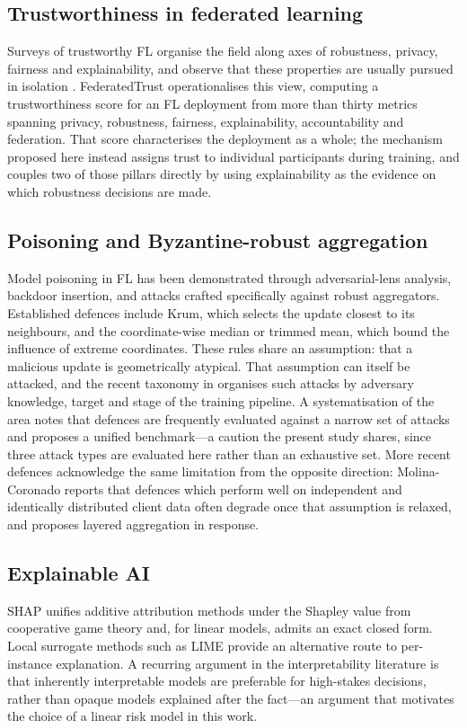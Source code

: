 \documentclass[conference]{IEEEtran}
\begin{document}
\subsection{Trustworthiness in federated learning}
Surveys of trustworthy FL organise the field along axes of robustness,
privacy, fairness and explainability, and observe that these properties are
usually pursued in isolation \cite{tariq2023trustworthy}. FederatedTrust
\cite{sanchez2023federatedtrust} operationalises this view, computing a
trustworthiness score for an FL deployment from more than thirty metrics
spanning privacy, robustness, fairness, explainability, accountability and
federation. That score characterises the deployment as a whole; the mechanism
proposed here instead assigns trust to individual participants during
training, and couples two of those pillars directly by using explainability as
the evidence on which robustness decisions are made.

\subsection{Poisoning and Byzantine-robust aggregation}
Model poisoning in FL has been demonstrated through adversarial-lens
analysis, backdoor insertion, and attacks crafted specifically against robust
aggregators. Established defences include Krum, which selects the update
closest to its neighbours, and the coordinate-wise median or trimmed mean,
which bound the influence of extreme coordinates. These rules share an
assumption: that a malicious update is geometrically atypical. That assumption
can itself be attacked, and the recent taxonomy in \cite{sagar2023poisoning}
organises such attacks by adversary knowledge, target and stage of the
training pipeline. A systematisation of the area \cite{zhang2025sok} notes
that defences are frequently evaluated against a narrow set of attacks and
proposes a unified benchmark---a caution the present study shares, since three
attack types are evaluated here rather than an exhaustive set.
More recent defences acknowledge the same limitation from the opposite
direction: Molina-Coronado \cite{molina2024celtibero} reports that defences
which perform well on independent and identically distributed client data
often degrade once that assumption is relaxed, and proposes layered
aggregation in response.

\subsection{Explainable AI}
SHAP unifies additive attribution methods under the Shapley value from
cooperative game theory and, for linear models, admits an exact closed form.
Local surrogate methods such as LIME provide an alternative route to
per-instance explanation. A recurring argument in the interpretability
literature is that inherently interpretable models are preferable for
high-stakes decisions, rather than opaque models explained after the fact---an
argument that motivates the choice of a linear risk model in this work.
\end{document}
